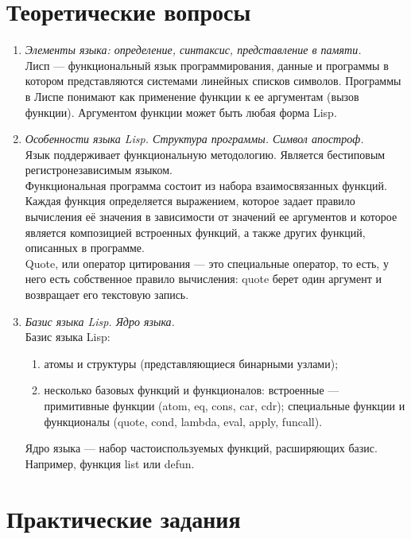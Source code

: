 \chapter{Теоретические вопросы}
\begin{enumerate}[wide=0pt]
	\item \textit{Элементы языка: определение, синтаксис, представление в памяти.} \\
	Лисп --- функциональный язык программирования, данные и программы в котором представляются системами линейных списков символов. Программы в Лиспе понимают как применение функции к ее аргументам (вызов
	функции). Аргументом функции может быть любая форма Lisp.
	\item \textit{Особенности языка Lisp. Структура программы. Символ апостроф.} \\
	Язык поддерживает функциональную методологию. Является бестиповым регистронезависимым языком.\\
	Функциональная программа состоит из набора взаимосвязанных функций. Каждая функция определяется выражением, которое задает правило вычисления её значения в зависимости от значений ее аргументов и которое является композицией встроенных функций, а также других функций, описанных в программе. \\
	Quote, или оператор цитирования --- это специальные оператор, то есть, у него есть собственное правило вычисления: quote берет один аргумент и возвращает его текстовую запись. 
	\item \textit{Базис языка Lisp. Ядро языка.} \\
	Базис языка Lisp:
	\begin{enumerate}
		\item атомы и структуры (представляющиеся бинарными узлами);
		\item несколько базовых функций и функционалов: встроенные --- примитивные функции (atom, eq, cons, car, cdr); специальные функции и функционалы (quote, cond, lambda, eval, apply, funcall).
	\end{enumerate}
	Ядро языка --- набор частоиспользуемых функций, расширяющих базис. Например, функция list или defun. 
\end{enumerate}
\chapter{Практические задания}

